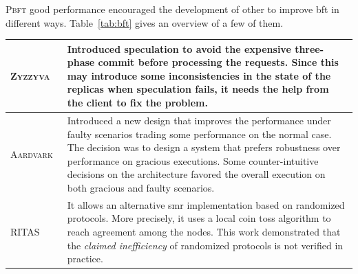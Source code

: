 


\textsc{Pbft} good performance encouraged the development of other to improve \gls{bft} in different ways. 
Table~\ref{tab:bft} gives an overview of a few of them.


\begin{table}[t]
\begin{center}
{\footnotesize
\begin{tabular}{ p{2.4cm}  p{11.5cm}  }\hline
\textsc{Zyzzyva}~\cite{Kotla:2010}  & Introduced speculation to avoid the expensive three-phase commit before processing the requests. Since this may introduce some inconsistencies in the state of the replicas when speculation fails, it needs the help from the client to fix the problem. \\ \hline            

\textsc{Aardvark}~\cite{Clement:2009b} & Introduced a new design that improves the performance under faulty scenarios trading some performance on the normal case. The decision was to design a system that prefers robustness over performance on gracious executions. Some counter-intuitive decisions on the architecture favored the overall execution on both gracious and faulty scenarios. \\ \hline


\textsc{RITAS}~\cite{Moniz:2011} & It allows an alternative \gls{smr} implementation based on randomized protocols. More precisely, it uses a local coin toss algorithm to reach agreement among the nodes. This work demonstrated that the \emph{claimed inefficiency} of randomized protocols is not verified in practice.  \\ \hline


\end{tabular}}
\end{center}
\end{table}
